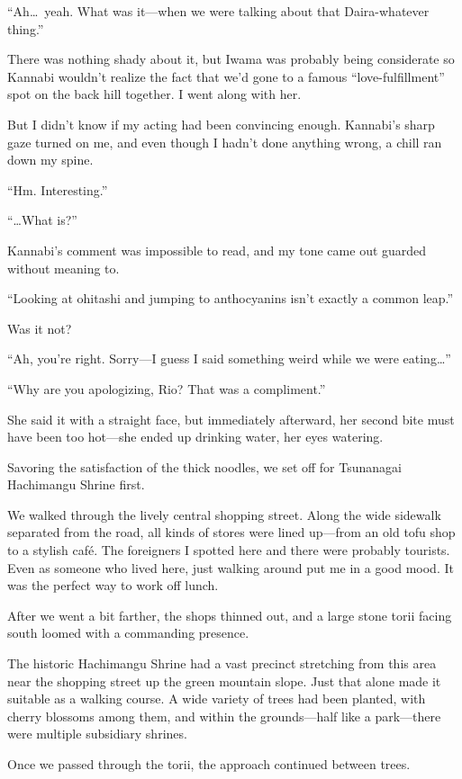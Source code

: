 \documentclass[
    a4paper,
    12pt,
    twoside,
    openany,
    UTF8,
    fontset=windows
]{ctexbook}
\begin{document}
``Ah\dots\ yeah. What was it---when we were talking about that Daira-whatever thing.''

There was nothing shady about it, but Iwama was probably being considerate so Kannabi wouldn't realize the fact that we'd gone to a famous ``love-fulfillment'' spot on the back hill together. I went along with her.

But I didn't know if my acting had been convincing enough. Kannabi's sharp gaze turned on me, and even though I hadn't done anything wrong, a chill ran down my spine.

``Hm. Interesting.''

``\dots What is?''

Kannabi's comment was impossible to read, and my tone came out guarded without meaning to.

``Looking at ohitashi and jumping to anthocyanins isn't exactly a common leap.''

Was it not?

``Ah, you're right. Sorry---I guess I said something weird while we were eating\dots''

``Why are you apologizing, Rio? That was a compliment.''

She said it with a straight face, but immediately afterward, her second bite must have been too hot---she ended up drinking water, her eyes watering.

Savoring the satisfaction of the thick noodles, we set off for Tsunanagai Hachimangu Shrine first.

We walked through the lively central shopping street. Along the wide sidewalk separated from the road, all kinds of stores were lined up---from an old tofu shop to a stylish café. The foreigners I spotted here and there were probably tourists. Even as someone who lived here, just walking around put me in a good mood. It was the perfect way to work off lunch.

After we went a bit farther, the shops thinned out, and a large stone torii facing south loomed with a commanding presence.

The historic Hachimangu Shrine had a vast precinct stretching from this area near the shopping street up the green mountain slope. Just that alone made it suitable as a walking course. A wide variety of trees had been planted, with cherry blossoms among them, and within the grounds---half like a park---there were multiple subsidiary shrines.

Once we passed through the torii, the approach continued between trees.
\end{document}
